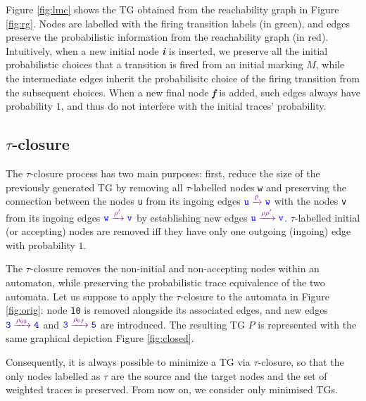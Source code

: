 \begin{example}
Figure \ref{fig:lmc} shows the TG obtained from the reachability graph in Figure \ref{fig:rg}. Nodes are labelled with the firing 
transition labels (in green), and edges preserve the probabilistic information from the reachability graph (in red). Intuitively, when a 
new initial node \textit{\textbf{i}} is inserted, we preserve all the initial probabilistic choices that a transition is fired from an initial 
marking $M$, while the intermediate edges inherit the probabilisitc choice of the firing transition from the subsequent choices. When 
a new final node \textit{\textbf{f}} is added, such edges always have probability $1$, and thus do not interfere with the 
initial traces' probability.
\end{example}

\subsection{$\tau$-closure}\label{sec:clos}
The $\tau$-closure process has two main purposes: first, reduce the size of the previously generated TG by removing all 
$\tau$-labelled nodes \texttt{\color{blue}w} and preserving the connection between  the nodes \texttt{\color{blue}u} 
from its ingoing edges   $\texttt{\color{blue}u}\xrightarrow{\color{violet}\rho}\texttt{\color{blue}w}$ with the nodes \texttt{\color{blue}v} from its ingoing edges   $\texttt{\color{blue}w}\xrightarrow{\color{violet}\rho'}\texttt{\color{blue}v}$ by establishing new edges $\texttt{\color{blue}u}\xrightarrow{\color{violet}\rho\rho'}\texttt{\color{blue}v}$. $\tau$-labelled initial (or accepting) nodes are removed iff they have only one outgoing (ingoing) edge with probability $1$.

\begin{example}
	The $\tau$-closure removes the non-initial and non-accepting nodes within an automaton, while preserving the probabilistic trace equivalence of the two automata. Let us suppose to apply the $\tau$-closure to the automata in Figure \ref{fig:orig}: node \texttt{\color{blue}10} is removed alongside its associated edges, and new edges $\texttt{\color{blue}3}\xrightarrow{\color{violet}\rho_{65}}\texttt{\color{blue}4}$ and $\texttt{\color{blue}3}\xrightarrow{\color{violet}\rho_{6f}}\texttt{\color{blue}5}$ are introduced. The resulting TG $P$ is represented with the same graphical depiction Figure \ref{fig:closed}.
\end{example}
%
Consequently, it is always possible to minimize a TG  via $\tau$-closure, so that the only nodes labelled as $\tau$ 
are the source and the target nodes and the set of weighted traces is preserved. From now on, we consider only minimised TGs. 

